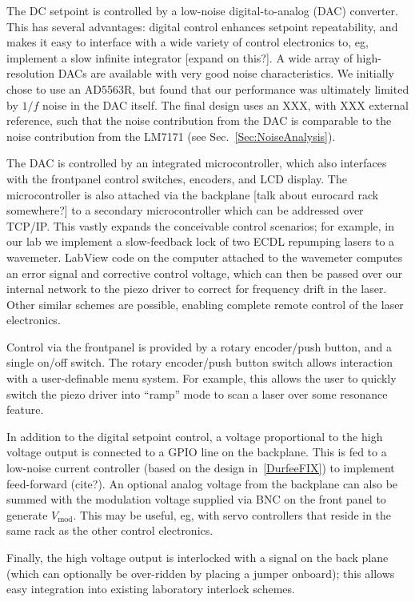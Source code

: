 \documentclass[aip,rsi,reprint]{revtex4-1} %
\begin{document}
The DC setpoint is controlled by a low-noise digital-to-analog (DAC) converter.
This has several advantages: digital control enhances setpoint repeatability, and makes it easy to interface with a wide variety of control electronics to, eg, implement a slow infinite integrator [expand on this?]. 
A wide array of high-resolution DACs are available with very good noise characteristics.
We initially chose to use an AD5563R, but found that our performance was ultimately limited by $1/f$ noise in the DAC itself.
The final design uses an XXX, with XXX external reference, such that the noise contribution from the DAC is comparable to the noise contribution from the LM7171 (see Sec.~\ref{Sec:NoiseAnalysis}).

The DAC is controlled by an integrated microcontroller, which also interfaces with the frontpanel control switches, encoders, and LCD display.
The microcontroller is also attached via the backplane [talk about eurocard rack somewhere?] to a secondary microcontroller which can be addressed over TCP/IP.
This vastly expands the conceivable control scenarios; for example, in our lab we implement a slow-feedback lock of two ECDL repumping lasers to a wavemeter. 
LabView code on the computer attached to the wavemeter computes an error signal and corrective control voltage, which can then be passed over our internal network to the piezo driver to correct for frequency drift in the laser.
Other similar schemes are possible, enabling complete remote control of the laser electronics.

Control via the frontpanel is provided by a rotary encoder/push button, and a single on/off switch.
The rotary encoder/push button switch allows interaction with a user-definable menu system.
For example, this allows the user to quickly switch the piezo driver into ``ramp'' mode to scan a laser over some resonance feature.

In addition to the digital setpoint control, a voltage proportional to the high voltage output is connected to a GPIO line on the backplane.
This is fed to a low-noise current controller (based on the design in~\ref{DurfeeFIX}) to implement feed-forward (cite?).
An optional analog voltage from the backplane can also be summed with the modulation voltage supplied via BNC on the front panel to generate $V_{\text{mod}}$.
This may be useful, eg, with servo controllers that reside in the same rack as the other control electronics.

Finally, the high voltage output is interlocked with a signal on the back plane (which can optionally be over-ridden by placing a jumper onboard); this allows easy integration into existing laboratory interlock schemes.
\end{document}
